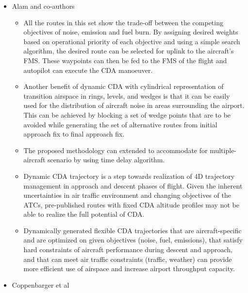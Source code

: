 \documentclass{aer1315-pretty}
\begin{document}
\begin{itemize}
\item Alam and co-authors \cite{Alam:2010} 
\begin{itemize}
\item  All the routes in this set show the trade-off between the competing objectives of noise, emission and fuel burn. By assigning desired weights based on operational
priority of each objective and using a simple search algorithm, the desired route can be selected for uplink to the aircraft's FMS. These waypoints can then be fed
to the FMS of the flight and autopilot can execute the CDA manoeuver.
\item Another benefit of dynamic CDA with cylindrical representation of transition airspace in rings, levels, and wedges is that it can be easily used for the distribution of aircraft noise in areas surrounding the airport. This can be achieved by blocking a set of wedge points that are to be avoided while generating the set of alternative routes from initial approach fix to final approach fix.
\item The proposed methodology can extended to accommodate for multiple-aircraft scenario by using time delay algorithm. 
\item  Dynamic CDA trajectory is a step towards realization of 4D trajectory management in approach and descent phases of flight. Given the inherent uncertainties in air traffic environment and changing objectives of the ATCs, pre-published routes with fixed CDA altitude profiles may not be able to realize the full potential of CDA.
\item Dynamically generated flexible CDA trajectories that are aircraft-specific and are optimized on given objectives (noise, fuel, emissions), that satisfy hard constraints of aircraft performance during descent and approach, and that can meet air traffic constraints (traffic, weather) can provide more efficient use of airspace and increase airport throughput capacity.
\end{itemize}


\item Coppenbarger et al \cite{Copp:2010b} 


\end{itemize}
\end{document}
